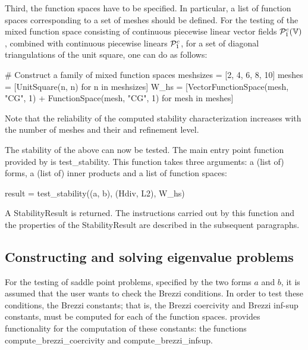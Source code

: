 Third, the function spaces have to be specified. In particular, a list
of function spaces corresponding to a set of meshes should be defined.
For the testing of the mixed function space consisting of continuous
piecewise linear vector fields $\mathcal{P}^c_1(\mathbb{V})$, combined with
continuous piecewise linears $\mathcal{P}^c_1$, for a set of diagonal
triangulations of the unit square, one can do as follows:
\begin{python}
  # Construct a family of mixed function spaces
  meshsizes = [2, 4, 6, 8, 10]
  meshes = [UnitSquare(n, n) for n in meshsizes]
  W_hs = [VectorFunctionSpace(mesh, "CG", 1) + FunctionSpace(mesh, "CG", 1)
          for mesh in meshes]
\end{python}
Note that the reliability of the computed stability characterization
increases with the number of meshes and their and refinement level.

The stability of the above can now be tested. The main entry point
function provided by \ascot{} is \textrm{test\_stability}. This
function takes three arguments: a (list of) forms, a (list of) inner
products and a list of function spaces:
\begin{python}
  result = test_stability((a, b), (Hdiv, L2), W_hs)
\end{python}
A \textrm{StabilityResult} is returned.  The instructions carried out
by this function and the properties of the \textrm{StabilityResult}
are described in the subsequent paragraphs.

\subsection{Constructing and solving eigenvalue problems}

For the testing of saddle point problems, specified by the two forms
$a$ and $b$, it is assumed that the user wants to check the Brezzi
conditions. In order to test these conditions, the Brezzi constants;
that is, the Brezzi coercivity and Brezzi inf-sup constants, must be
computed for each of the function spaces. \ascot{} provides
functionality for the computation of these constants: the functions
\textrm{compute\_brezzi\_coercivity} and
\textrm{compute\_brezzi\_infsup}.

